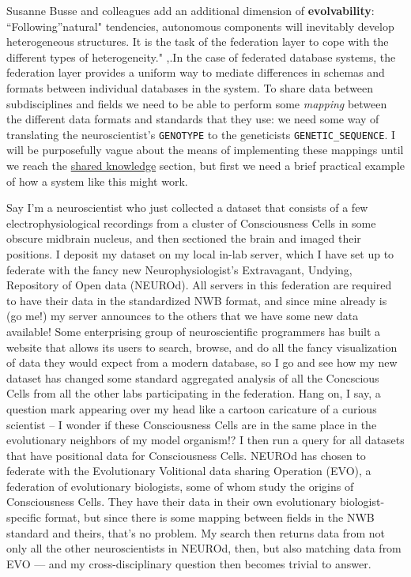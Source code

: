 \documentclass{article}
\begin{document}
Susanne Busse and colleagues add an additional dimension of
\textbf{evolvability}: ``Following''natural" tendencies, autonomous
components will inevitably develop heterogeneous structures. It is the
task of the federation layer to cope with the different types of
heterogeneity." \cite{busseFederatedInformationSystems1999},.In
the case of federated database systems, the federation layer provides a
uniform way to mediate differences in schemas and formats between
individual databases in the system. To share data between subdisciplines
and fields we need to be able to perform some \emph{mapping} between the
different data formats and standards that they use: we need some way of
translating the neuroscientist's \texttt{GENOTYPE} to the geneticists
\texttt{GENETIC\_SEQUENCE}. I will be purposefully vague about the means
of implementing these mappings until we reach the
\protect\hyperlink{shared-knowledge}{shared knowledge} section, but
first we need a brief practical example of how a system like this might
work.

Say I'm a neuroscientist who just collected a dataset that consists of a
few electrophysiological recordings from a cluster of Consciousness
Cells in some obscure midbrain nucleus, and then sectioned the brain and
imaged their positions. I deposit my dataset on my local in-lab server,
which I have set up to federate with the fancy new Neurophysiologist's
Extravagant, Undying, Repository of Open data (NEUROd). All servers in
this federation are required to have their data in the standardized NWB
format, and since mine already is (go me!) my server announces to the
others that we have some new data available! Some enterprising group of
neuroscientific programmers has built a website that allows its users to
search, browse, and do all the fancy visualization of data they would
expect from a modern database, so I go and see how my new dataset has
changed some standard aggregated analysis of all the Concscious Cells
from all the other labs participating in the federation. Hang on, I say,
a question mark appearing over my head like a cartoon caricature of a
curious scientist -- I wonder if these Consciousness Cells are in the
same place in the evolutionary neighbors of my model organism!? I then
run a query for all datasets that have positional data for Consciousness
Cells. NEUROd has chosen to federate with the Evolutionary Volitional
data sharing Operation (EVO), a federation of evolutionary biologists,
some of whom study the origins of Consciousness Cells. They have their
data in their own evolutionary biologist-specific format, but since
there is some mapping between fields in the NWB standard and theirs,
that's no problem. My search then returns data from not only all the
other neuroscientists in NEUROd, then, but also matching data from EVO
--- and my cross-disciplinary question then becomes trivial to answer.
\end{document}
